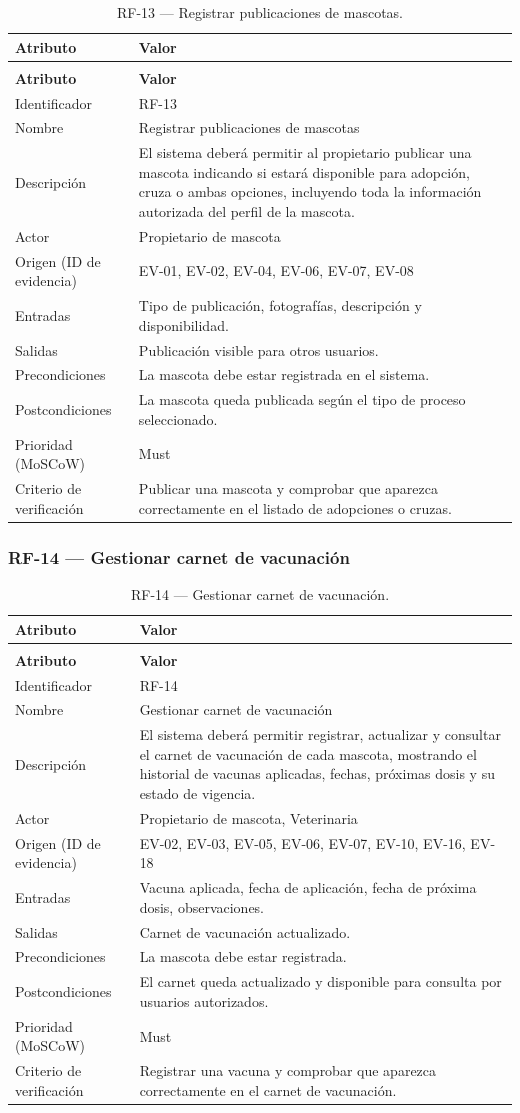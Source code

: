 \documentclass[journal,onecolumn]{IEEEtran}
\makeatletter
\newenvironment{atributos}[2]{%
	\small
	\begin{longtable}{@{}>{\raggedright\arraybackslash}p{4.2cm} >{\raggedright\arraybackslash}p{11.2cm}@{}}
		\caption{#2}\label{tab:#1}\\
		\toprule
		\textbf{Atributo} & \textbf{Valor} \\
		\midrule
		\endfirsthead
		\multicolumn{2}{@{}l}{\small\itshape (continuación)}\\
		\toprule
		\textbf{Atributo} & \textbf{Valor} \\
		\midrule
		\endhead
		\bottomrule
		\endlastfoot
	}{%
	\end{longtable}
	\normalsize
}
\makeatother
\begin{document}
	\begin{atributos}{RF-13}{RF-13 --- Registrar publicaciones de mascotas.}
		Identificador & RF-13 \\
		Nombre & Registrar publicaciones de mascotas \\
		Descripción & El sistema deberá permitir al propietario publicar una mascota indicando si estará disponible para adopción, cruza o ambas opciones, incluyendo toda la información autorizada del perfil de la mascota. \\
		Actor & Propietario de mascota \\
		Origen (ID de evidencia) & EV-01, EV-02, EV-04, EV-06, EV-07, EV-08 \\
		Entradas & Tipo de publicación, fotografías, descripción y disponibilidad. \\
		Salidas & Publicación visible para otros usuarios. \\
		Precondiciones & La mascota debe estar registrada en el sistema. \\
		Postcondiciones & La mascota queda publicada según el tipo de proceso seleccionado. \\
		Prioridad (MoSCoW) & Must \\
		Criterio de verificación & Publicar una mascota y comprobar que aparezca correctamente en el listado de adopciones o cruzas. \\
	\end{atributos}
	
	\subsubsection{RF-14 --- Gestionar carnet de vacunación}
	
	\begin{atributos}{RF-14}{RF-14 --- Gestionar carnet de vacunación.}
		Identificador & RF-14 \\
		Nombre & Gestionar carnet de vacunación \\
		Descripción & El sistema deberá permitir registrar, actualizar y consultar el carnet de vacunación de cada mascota, mostrando el historial de vacunas aplicadas, fechas, próximas dosis y su estado de vigencia. \\
		Actor & Propietario de mascota, Veterinaria \\
		Origen (ID de evidencia) & EV-02, EV-03, EV-05, EV-06, EV-07, EV-10, EV-16, EV-18 \\
		Entradas & Vacuna aplicada, fecha de aplicación, fecha de próxima dosis, observaciones. \\
		Salidas & Carnet de vacunación actualizado. \\
		Precondiciones & La mascota debe estar registrada. \\
		Postcondiciones & El carnet queda actualizado y disponible para consulta por usuarios autorizados. \\
		Prioridad (MoSCoW) & Must \\
		Criterio de verificación & Registrar una vacuna y comprobar que aparezca correctamente en el carnet de vacunación. \\
	\end{atributos}
	
\end{document}
